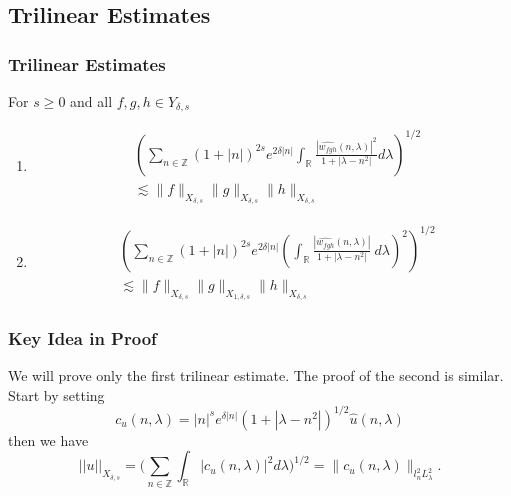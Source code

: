 \documentclass{beamer}
\numberwithin{equation}{section}
\newcommand{\rr}{\mathbb{R}}
\newcommand{\zz}{\mathbb{Z}}
\newcommand{\wh}{\widehat}
\begin{document}
\subsection{Trilinear Estimates}
\begin{frame}
  \frametitle{Trilinear Estimates}
\begin{lemma}\label{bilinear1}
 For $s\ge 0$ and all $f, g, h \in Y_{\delta,s}$
 \begin{enumerate}
   \item
 \begin{align*}
   & \left ( \sum_{n \in {\mathbb{Z}}} (1+|n|)^{2s}e^{2\delta |n|}
\int_{\mathbb{R}}
\frac{|\widehat{w_{fgh}}(n, \lambda)|^2}{1+|\lambda -n^2|}
d\lambda
\right )^{1/2}
\\
& \lesssim \|f\|_{X_{\delta,s}} \|g\|_{X_{\delta,
s}}\|h\|_{X_{\delta,s}} 
\end{align*}
\item
\begin{align*}
& \left( \sum_{n \in \zz} \left (1 + |n| \right )^{2s} e^{2\delta |n|} \left (
\int_\rr \frac{|\wh{w_{fgh}}(n, \lambda) |}{1 + | \lambda - n^{2} |} \ d\lambda
\right)^2  \right)^{1/2}
\\
& \lesssim \|f\|_{X_{\delta,s}} \|g\|_{X_{1, \delta,
s}}\|h\|_{X_{\delta,s}}
\end{align*}
\end{enumerate}
\end{lemma}
\end{frame}
%
%
\begin{frame}
  \frametitle{Key Idea in Proof}
We will prove only the first trilinear estimate. The proof of the second is
similar. Start by setting
\begin{equation*}
c_u(n,\lambda)=|n|^s e^{\delta |n|}(1+|\lambda-n^2|)^{1/2}\widehat{u}(n,\lambda)
\end{equation*}
then we have
\begin{equation*}
||u||_{{X}_{\delta,s}}=\Big (\sum_{n\in \mathbb{{Z}}}\int_{\mathbb{R}}|c_u(n,\lambda)|^2d\lambda \Big )^{1/2}
=\| c_u(n,\lambda) \|_{l^2_n L^2_{\lambda}}.
\end{equation*}
\end{frame}
\end{document}

